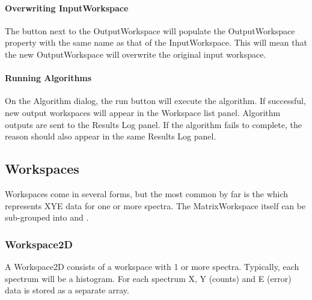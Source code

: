 \documentclass[letterpaper,10pt,english,openany]{sphinxmanual}
\let\sphinxpxdimen\pdfpxdimen\else\newdimen\sphinxpxdimen
\begin{document}
\paragraph{Overwriting InputWorkspace}
\label{\detokenize{mantid_basic_course/algorithms_workspaces_and_histories/02_algorithms:overwriting-inputworkspace}}
The button next to the OutputWorkspace will populate the OutputWorkspace
property with the same name as that of the InputWorkspace. This will
mean that the new OutputWorkspace will overwrite the original input
workspace.


\paragraph{Running Algorithms}
\label{\detokenize{mantid_basic_course/algorithms_workspaces_and_histories/02_algorithms:running-algorithms}}
On the Algorithm dialog, the run button will execute the algorithm. If
successful, new output workspaces will appear in the Workspace list
panel. Algorithm outputs are sent to the Results Log panel. If the
algorithm fails to complete, the reason should also appear in the same
Results Log panel.




\subsection{Workspaces}
\label{\detokenize{mantid_basic_course/algorithms_workspaces_and_histories/03_workspaces:workspaces}}\label{\detokenize{mantid_basic_course/algorithms_workspaces_and_histories/03_workspaces:id1}}\label{\detokenize{mantid_basic_course/algorithms_workspaces_and_histories/03_workspaces::doc}}
Workspaces come in several forms, but the most common by far is the
 which represents XYE data for one
or more spectra. The MatrixWorkspace itself can be sub-grouped into
 and .

\begin{figure}[H]
\centering

\noindent\sphinxincludegraphics[width=300\sphinxpxdimen]{{MatrixWorkspaceHierachy}.png}
\end{figure}


\subsubsection{Workspace2D}
\label{\detokenize{mantid_basic_course/algorithms_workspaces_and_histories/03_workspaces:workspace2d}}
A Workspace2D consists of a workspace with 1 or more spectra. Typically,
each spectrum will be a histogram. For each spectrum X, Y (counts) and E
(error) data is stored as a separate array.
\end{document}
